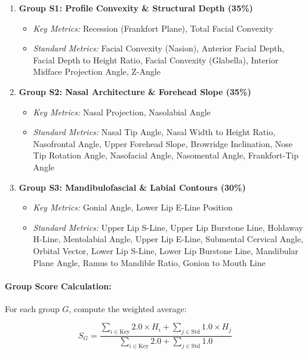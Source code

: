 \begin{enumerate}
    \item \textbf{Group S1: Profile Convexity \& Structural Depth (35\%)}
    \begin{itemize}
        \item \textit{Key Metrics:} Recession (Frankfort Plane), Total Facial Convexity
        \item \textit{Standard Metrics:} Facial Convexity (Nasion), Anterior Facial Depth, Facial Depth to Height Ratio, Facial Convexity (Glabella), Interior Midface Projection Angle, Z-Angle
    \end{itemize}
    
    \item \textbf{Group S2: Nasal Architecture \& Forehead Slope (35\%)}
    \begin{itemize}
        \item \textit{Key Metrics:} Nasal Projection, Nasolabial Angle
        \item \textit{Standard Metrics:} Nasal Tip Angle, Nasal Width to Height Ratio, Nasofrontal Angle, Upper Forehead Slope, Browridge Inclination, Nose Tip Rotation Angle, Nasofacial Angle, Nasomental Angle, Frankfort-Tip Angle
    \end{itemize}
    
    \item \textbf{Group S3: Mandibulofascial \& Labial Contours (30\%)}
    \begin{itemize}
        \item \textit{Key Metrics:} Gonial Angle, Lower Lip E-Line Position
        \item \textit{Standard Metrics:} Upper Lip S-Line, Upper Lip Burstone Line, Holdaway H-Line, Mentolabial Angle, Upper Lip E-Line, Submental Cervical Angle, Orbital Vector, Lower Lip S-Line, Lower Lip Burstone Line, Mandibular Plane Angle, Ramus to Mandible Ratio, Gonion to Mouth Line
    \end{itemize}
\end{enumerate}

\paragraph{Group Score Calculation:}

For each group $G$, compute the weighted average:

\begin{equation}
S_G = \frac{\sum_{i \in \text{Key}} 2.0 \times H_i + \sum_{j \in \text{Std}} 1.0 \times H_j}{\sum_{i \in \text{Key}} 2.0 + \sum_{j \in \text{Std}} 1.0}
\end{equation}

